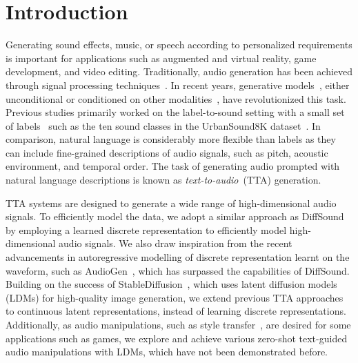 \documentclass{article}
\begin{document}
\section{Introduction}
\label{Introduction}



Generating sound effects, music, or speech according to personalized requirements is important for applications such as augmented and virtual reality, game development, and video editing. Traditionally, audio generation has been achieved through signal processing techniques~\cite{andresen1979new, karplus1983digital}. In recent years, generative models~\cite{oord2016wavenet, DDPM, SGM, tan2022naturalspeech}, either unconditional or conditioned on other modalities~\cite{kreuk2022audiogen, zelaszczyk2022audio}, have revolutionized this task. Previous studies primarily worked on the label-to-sound setting with a small set of labels~\cite{liu2021conditional,pascual2022full} such as the ten sound classes in the UrbanSound8K dataset~\cite{salamon2014dataset}.
In comparison, natural language is considerably more flexible than labels as they can include fine-grained descriptions of audio signals, such as pitch, acoustic environment, and temporal order. 
The task of generating audio prompted with natural language descriptions is known as \textit{text-to-audio}~(TTA) generation.






TTA systems are designed to generate a wide range of high-dimensional audio signals. To efficiently model the data, we adopt a similar approach as DiffSound~\cite{yang2022diffsound} by employing a learned discrete representation to efficiently model high-dimensional audio signals. We also draw inspiration from the recent advancements in autoregressive modelling of discrete representation learnt on the waveform, such as AudioGen~\cite{kreuk2022audiogen}, which has surpassed the capabilities of DiffSound. Building on the success of StableDiffusion~\cite{rombach2022high}, which uses latent diffusion models (LDMs) for high-quality image generation, we extend previous TTA approaches to continuous latent representations, instead of learning discrete representations. Additionally, as audio manipulations, such as style transfer~\cite{engel2020ddsp, pascual2022full}, are desired for some applications such as games, 
we explore and achieve various zero-shot text-guided audio manipulations with LDMs, which have not been demonstrated before.
\end{document}
